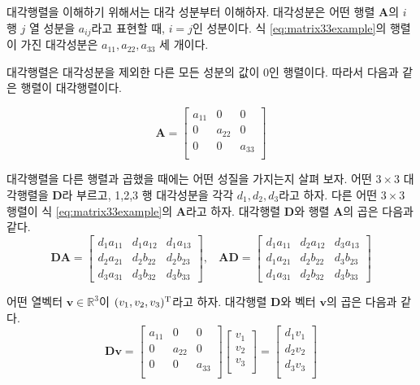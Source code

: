 대각행렬을 이해하기 위해서는 대각 성분부터 이해하자.
대각성분은 어떤 행렬 $\mathbf A$의 $i$ 행 $j$ 열 성분을 $a_{ij}$라고 표현할 때, $i=j$인 성분이다.
식 \ref{eq:matrix33example}의 행렬이 가진 대각성분은 $a_{11}, a_{22}, a_{33}$ 세 개이다.

대각행렬은 대각성분을 제외한 다른 모든 성분의 값이 0인 행렬이다. 따라서 다음과 같은 행렬이 대각행렬이다.

$$\mathbf A = \left [ 
\begin{array}{ccc}
a_{11} & 0 & 0 \\
0 & a_{22} & 0 \\
0 & 0 & a_{33} \\
\end{array}
\right ]$$

대각행렬을 다른 행렬과 곱했을 때에는 어떤 성질을 가지는지 살펴 보자.
어떤 $3 \times 3$ 대각행렬을 $\mathbf D$라 부르고,
1,2,3 행 대각성분을 각각 $d_1, d_2, d_3$라고 하자.
다른 어떤 $3 \times 3$ 행렬이 식 \ref{eq:matrix33example}의  $\mathbf A$라고 하자.
대각행렬 $\mathbf D$와 행렬 $\mathbf A$의 곱은 다음과 같다.
$$
\mathbf{DA} = \left [
\begin{array}{ccc}
d_1 a_{11} & d_1 a_{12} & d_1 a_{13} \\
d_2 a_{21} & d_2 b_{22} & d_2 b_{23} \\
d_3 a_{31} & d_3 b_{32} & d_3 b_{33}
\end{array}
\right ]
,~~~~
\mathbf{AD} = \left [
\begin{array}{ccc}
d_1 a_{11} & d_2 a_{12} & d_3 a_{13} \\
d_1 a_{21} & d_2 b_{22} & d_3 b_{23} \\
d_1 a_{31} & d_2 b_{32} & d_3 b_{33}
\end{array}
\right ]
$$

어떤 열벡터 $\mathbf v \in \mathbb R^3$이 $(v_1, v_2, v_3)^{\rm T}$라고 하자. 대각행렬 $\mathbf D$와 벡터 $\mathbf v$의 곱은 다음과 같다.
$$
\mathbf {Dv} = 
\left [ 
\begin{array}{ccc}
a_{11} & 0 & 0 \\
0 & a_{22} & 0 \\
0 & 0 & a_{33} \\
\end{array}
\right ]
\left [
\begin{array}{c}
v_1 \\
v_2 \\
v_3 \\
\end{array}
\right ]
=
\left [
\begin{array}{c}
d_1 v_1 \\
d_2 v_2 \\
d_3 v_3 \\
\end{array}
\right ]
$$


